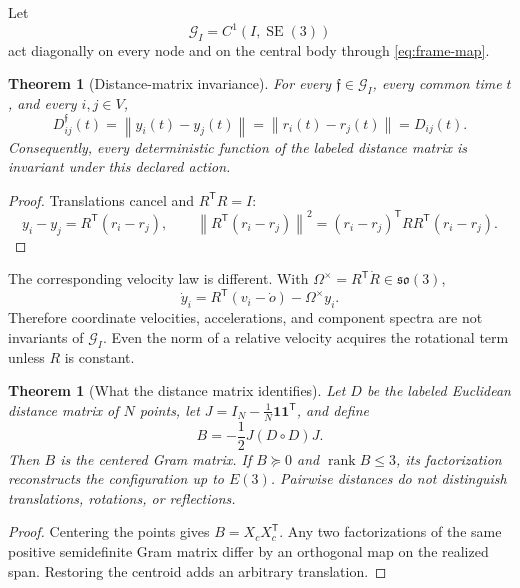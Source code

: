 \documentclass[11pt,a4paper]{article}
\theoremstyle{definition}
\theoremstyle{plain}
\newtheorem{theorem}[definition]{Theorem}
\theoremstyle{remark}
\newcommand{\SE}{\operatorname{SE}}
\newcommand{\rank}{\operatorname{rank}}
\newcommand{\norm}[1]{\left\lVert #1\right\rVert}
\newcommand{\Gcal}{\mathcal G}
\begin{document}
Let
\[
\Gcal_I=C^1(I,\SE(3))
\]
act diagonally on every node and on the central body through
\cref{eq:frame-map}.

\begin{theorem}[Distance-matrix invariance]
\label{thm:distance}
For every \(\mathfrak f\in\Gcal_I\), every common time \(t\), and
every \(i,j\in V\),
\begin{equation}\label{eq:distance-invariant}
D_{ij}^{\mathfrak f}(t)
=\norm{y_i(t)-y_j(t)}
=\norm{r_i(t)-r_j(t)}
=D_{ij}(t).
\end{equation}
Consequently, every deterministic function of the labeled distance
matrix is invariant under this declared action.
\end{theorem}

\begin{proof}
Translations cancel and \(R^\mathsf TR=I\):
\[
y_i-y_j=R^\mathsf T(r_i-r_j),\qquad
\norm{R^\mathsf T(r_i-r_j)}^2
=(r_i-r_j)^\mathsf T RR^\mathsf T(r_i-r_j).
\]
\end{proof}

The corresponding velocity law is different.  With
\(\Omega^\times=R^\mathsf T\dot R\in\mathfrak{so}(3)\),
\begin{equation}\label{eq:velocity-law}
\dot y_i=R^\mathsf T(v_i-\dot o)-\Omega^\times y_i .
\end{equation}
Therefore coordinate velocities, accelerations, and component spectra
are not invariants of \(\Gcal_I\).  Even the norm of a relative
velocity acquires the rotational term unless \(R\) is constant.

\begin{theorem}[What the distance matrix identifies]
\label{thm:edm}
Let \(D\) be the labeled Euclidean distance matrix of \(N\) points,
let \(J=I_N-\frac1N\bm1\bm1^\mathsf T\), and define
\begin{equation}\label{eq:gram}
B=-\frac12J(D\circ D)J .
\end{equation}
Then \(B\) is the centered Gram matrix.  If \(B\succeq0\) and
\(\rank B\le3\), its factorization reconstructs the configuration up
to \(E(3)\).  Pairwise distances do not distinguish translations,
rotations, or reflections.
\end{theorem}

\begin{proof}
Centering the points gives \(B=X_cX_c^\mathsf T\).  Any two
factorizations of the same positive semidefinite Gram matrix differ
by an orthogonal map on the realized span.  Restoring the centroid
adds an arbitrary translation.
\end{proof}
\end{document}
